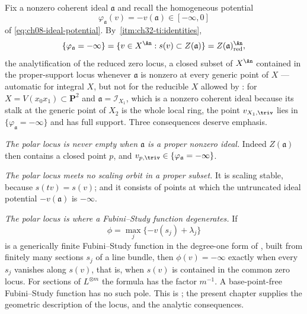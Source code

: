Fix a nonzero coherent ideal $\mathfrak a$ and recall the homogeneous
potential
\[
 \varphi_{\mathfrak a}(v)=-v(\mathfrak a)\in[-\infty,0]
\]
of \eqref{eq:ch08-ideal-potential}.  By
\,\cref{itm:ch32-ti:identities},
\begin{equation}
\label{eq:ch32-potential-polar-locus}
 \{\varphi_{\mathfrak a}=-\infty\}
 =\{v\in X^{\An}:s(v)\subset Z(\mathfrak a)\}
 =Z(\mathfrak a)^{\An}_{\mathrm{red}},
\end{equation}
the analytification of the reduced zero locus, a closed subset of
$X^{\An}$ contained in the proper-support locus whenever $\mathfrak a$
is nonzero at every generic point of $X$ --- automatic for integral
$X$, but not for the reducible $X$ allowed by
: for $X=V(x_0x_1)\subset\mathbf P^2$ and
$\mathfrak a=\mathcal I_{X_1}$, which is a nonzero coherent ideal because
its stalk at the generic point of $X_2$ is the whole local ring, the
point $v_{X_1,\triv}$ lies in $\{\varphi_{\mathfrak a}=-\infty\}$ and
has full support.  Three consequences deserve emphasis.

\emph{The polar locus is never empty when $\mathfrak a$ is a proper
nonzero ideal.}  Indeed $Z(\mathfrak a)$ then contains a closed point
$p$, and $v_{p,\triv}\in\{\varphi_{\mathfrak a}=-\infty\}$.

\emph{The polar locus meets no scaling orbit in a proper subset.}  It is
scaling stable, because $s(tv)=s(v)$; and it consists of points at which
the untruncated ideal potential $-v(\mathfrak a)$ is $-\infty$.

\emph{The polar locus is where a Fubini--Study function degenerates.}  If
\[
 \phi=\max_j\{-v(s_j)+\lambda_j\}
\]
is a generically finite Fubini--Study function in the degree-one form of
, built from finitely many sections $s_j$ of a
line bundle, then $\phi(v)=-\infty$ exactly when every $s_j$ vanishes along $s(v)$,
that is, when $s(v)$ is contained in the common zero locus.  For sections
of $L^{\otimes m}$ the formula has the factor $m^{-1}$.  A base-point-free
Fubini--Study function has no such pole.  This is ; the present
chapter supplies the geometric description of the locus, and
 the analytic consequences.

